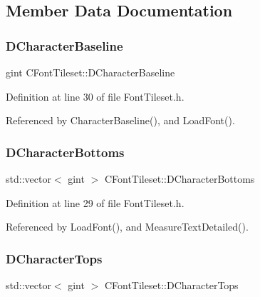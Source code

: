 \subsection{Member Data Documentation}
\hypertarget{classCFontTileset_aba19d07744c08aeb957728067c52466c}{}\label{classCFontTileset_aba19d07744c08aeb957728067c52466c} 
\subsubsection{\texorpdfstring{D\+Character\+Baseline}{DCharacterBaseline}}
{\footnotesize\ttfamily gint C\+Font\+Tileset\+::\+D\+Character\+Baseline\hspace{0.3cm}{\ttfamily [protected]}}



Definition at line 30 of file Font\+Tileset.\+h.



Referenced by Character\+Baseline(), and Load\+Font().

\hypertarget{classCFontTileset_a13d7063022d59bf3347452c78be50a8b}{}\label{classCFontTileset_a13d7063022d59bf3347452c78be50a8b} 
\subsubsection{\texorpdfstring{D\+Character\+Bottoms}{DCharacterBottoms}}
{\footnotesize\ttfamily std\+::vector$<$ gint $>$ C\+Font\+Tileset\+::\+D\+Character\+Bottoms\hspace{0.3cm}{\ttfamily [protected]}}



Definition at line 29 of file Font\+Tileset.\+h.



Referenced by Load\+Font(), and Measure\+Text\+Detailed().

\hypertarget{classCFontTileset_aa009ebe41a491d854a5f6005919649c2}{}\label{classCFontTileset_aa009ebe41a491d854a5f6005919649c2} 
\subsubsection{\texorpdfstring{D\+Character\+Tops}{DCharacterTops}}
{\footnotesize\ttfamily std\+::vector$<$ gint $>$ C\+Font\+Tileset\+::\+D\+Character\+Tops\hspace{0.3cm}{\ttfamily [protected]}}



